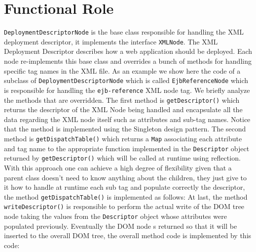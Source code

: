 \newpage
\section{Functional Role}
\texttt{DeploymentDescriptorNode} is the base class responsible for handling the XML deployment descriptor, it implements the interface \texttt{XMLNode}.\newline
The XML Deployment Descriptor describes how a web application should be deployed. Each node re-implements this base class and overrides a bunch of methods for handling specific tag names in the XML file. 
As an example we show here the code of a subclass of \texttt{DeploymentDescriptorNode} which is called \texttt{EjbReferenceNode} which is responsible for handling the \texttt{ejb-reference} XML node tag. We briefly analyze the methods that are overridden. \newline
The first method is \texttt{getDescriptor()} which returns the descriptor of the XML Node being handled and encapsulate all the data regarding the XML node itself such as attributes and sub-tag names. 
Notice that the method is implemented using the Singleton design pattern.\newline
The second method is \texttt{getDispatchTable()} which returns a \texttt{Map} associating each attribute and tag name to the appropriate function implemented in the \texttt{Descriptor} object returned by \texttt{getDescriptor()} which will be called at runtime using reflection. With this approach one can achieve a high degree of flexibility given that a parent class doesn't need to know anything about the children, they just give to it how to handle at runtime each sub tag and populate correctly the descriptor, the method \texttt{getDispatchTable()} is implemented as follows:
At last, the method \texttt{writeDescriptor()} is responsible to perform the actual write of the DOM tree node taking the values from the \texttt{Descriptor} object whose attributes were populated previously. Eventually the DOM node s returned so that it will be inserted to the overall DOM tree, the overall method code is implemented by this code:
